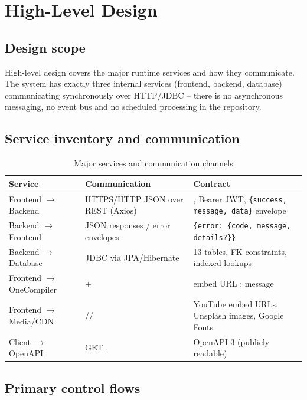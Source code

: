 \section{High-Level Design}
\label{sec:high-level-design}

\subsection{Design scope}

High-level design covers the major runtime services and how they communicate. The system has exactly three internal services (frontend, backend, database) communicating synchronously over HTTP/JDBC -- there is no asynchronous messaging, no event bus and no scheduled processing in the repository.

\subsection{Service inventory and communication}
\begin{table}[H]
\centering
\caption{Major services and communication channels}
\label{tab:hld-services}
\begin{tabular}{@{}L{3.4cm}L{4.4cm}L{6.4cm}@{}}
\toprule
\textbf{Service} & \textbf{Communication} & \textbf{Contract} \\
\midrule
Frontend $\rightarrow$ Backend & HTTPS/HTTP JSON over REST (Axios) & , Bearer JWT, \texttt{\{success, message, data\}} envelope \\
Backend $\rightarrow$ Frontend & JSON responses / error envelopes & \texttt{\{error: \{code, message, details?\}\}} \\
Backend $\rightarrow$ Database & JDBC via JPA/Hibernate & 13 tables, FK constraints, indexed lookups \\
Frontend $\rightarrow$ OneCompiler &  +  & embed URL ; message  \\
Frontend $\rightarrow$ Media/CDN & // & YouTube embed URLs, Unsplash images, Google Fonts \\
Client $\rightarrow$ OpenAPI & GET ,  & OpenAPI 3 (publicly readable) \\
\bottomrule
\end{tabular}
\end{table}

\subsection{Primary control flows}

